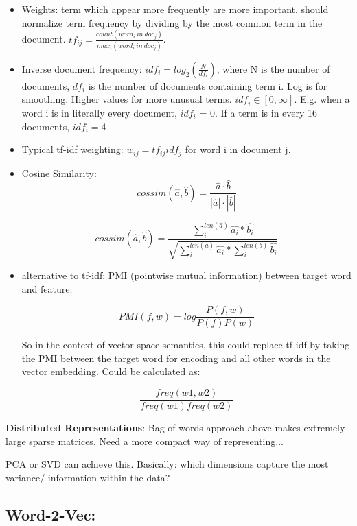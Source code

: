\documentclass[]{article}
\begin{document}
    \begin{itemize}
     \item Weights: term which appear more frequently  are more important. should normalize term frequency by dividing by the most common term in the document. $tf_{ij} = \frac{count(word_i \: in \: doc_j)}{max_i(word_i \: in \: doc_j)}$. 
     \item Inverse document frequency: $idf_i = log_2(\frac{N}{df_i})$, where N is the number of documents, $df_i$ is the number of documents containing term i. Log is for smoothing. Higher values for more unusual terms. $idf_i \in [0, \infty]$. E.g. when a word i is in literally every document, $idf_i$ = 0. If a term is in every 16 documents, $idf_i = 4$
     \item Typical tf-idf weighting: $w_{ij} = tf_{ij}idf_j$ for word i in document j.
     \item Cosine Similarity: $$cossim(\hat{a}, \hat{b}) = \frac{\hat{a} \cdot \hat{b}}{|\hat{a}| \cdot |\hat{b}|}$$
        
     $$cossim(\hat{a}, \hat{b}) 
     = \frac
     {\sum_i^{len(\hat{a})} \hat{a_i} * \hat{b_i}}
     {\sqrt{\sum_i^{len(\hat{a})}\hat{a_i} * \sum_i^{len(b)}\hat{b_i}}}$$
    
     \item alternative to tf-idf: PMI (pointwise mutual information) between target word and feature:
                
                $$PMI(f,w) = log \frac{P(f, w)}{P(f)P(w)}$$
                
                So in the context of vector space semantics, this could replace tf-idf by taking the PMI between the target word for encoding and all other words in the vector embedding. Could be calculated as:
                
                $$\frac{freq(w1,w2)}{freq(w1)freq(w2)}$$
    
    \end{itemize}
    
      \textbf{Distributed Representations}: Bag of words approach above makes extremely large sparse matrices. Need a more compact way of representing...
     
     PCA or SVD can achieve this. Basically: which dimensions capture the most variance/ information within the data? \\
     
     \subsection{Word-2-Vec:}
     
\end{document}
